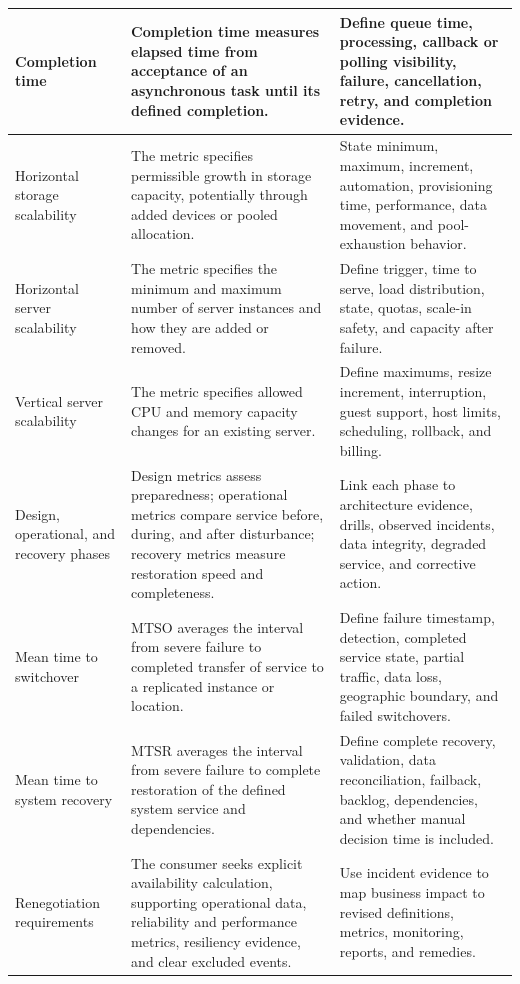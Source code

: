 \documentclass[11pt]{article}
\begin{document}
\begin{longtable}{@{}>{\RaggedRight\arraybackslash}p{}>{\RaggedRight\arraybackslash}p{}>{\RaggedRight\arraybackslash}p{}@{}}
Completion time & Completion time measures elapsed time from acceptance of an asynchronous task until its defined completion. & Define queue time, processing, callback or polling visibility, failure, cancellation, retry, and completion evidence. \\\midrule
Horizontal storage scalability & The metric specifies permissible growth in storage capacity, potentially through added devices or pooled allocation. & State minimum, maximum, increment, automation, provisioning time, performance, data movement, and pool-exhaustion behavior. \\\midrule
Horizontal server scalability & The metric specifies the minimum and maximum number of server instances and how they are added or removed. & Define trigger, time to serve, load distribution, state, quotas, scale-in safety, and capacity after failure. \\\midrule
Vertical server scalability & The metric specifies allowed CPU and memory capacity changes for an existing server. & Define maximums, resize increment, interruption, guest support, host limits, scheduling, rollback, and billing. \\\midrule
Design, operational, and recovery phases & Design metrics assess preparedness; operational metrics compare service before, during, and after disturbance; recovery metrics measure restoration speed and completeness. & Link each phase to architecture evidence, drills, observed incidents, data integrity, degraded service, and corrective action. \\\midrule
Mean time to switchover & MTSO averages the interval from severe failure to completed transfer of service to a replicated instance or location. & Define failure timestamp, detection, completed service state, partial traffic, data loss, geographic boundary, and failed switchovers. \\\midrule
Mean time to system recovery & MTSR averages the interval from severe failure to complete restoration of the defined system service and dependencies. & Define complete recovery, validation, data reconciliation, failback, backlog, dependencies, and whether manual decision time is included. \\\midrule
Renegotiation requirements & The consumer seeks explicit availability calculation, supporting operational data, reliability and performance metrics, resiliency evidence, and clear excluded events. & Use incident evidence to map business impact to revised definitions, metrics, monitoring, reports, and remedies. \\\midrule

\end{longtable}
\end{document}
